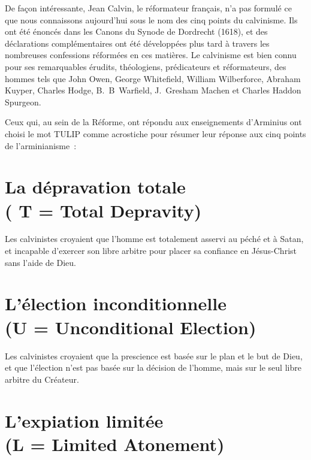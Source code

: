 
\begin{pocketpar}{}
\begin{digestpar}{}
De façon intéressante, Jean Calvin, le réformateur français, n'a pas formulé
 ce que nous con\-naissons au\-jour\-d'hui sous le nom des cinq points du calvinisme.
 Ils ont été énoncés dans les Canons du Synode de Dordrecht (1618), et des déclarations
 complémentaires ont été développées plus tard à travers les nombreuses
 confessions réformées en ces matières. Le calvinisme est bien connu
 pour 
 ses remarquables érudits, théologiens, prédicateurs et réformateurs,
 des hommes tels que John Owen, George Whitefield,
 William Wilberforce, Abraham Kuyper, Charles Hodge,\pocketlinebreak
 B.~B~Warfield, J.~Gresham Machen et
 Charles Haddon Spurgeon.
\end{digestpar}
\end{pocketpar}

Ceux qui, au sein de la Réforme, ont répondu aux enseignements d'Arminius
 ont choisi le mot \og TULIP \fg{} comme acrostiche pour résumer
 leur réponse aux cinq points de l'arminianisme~:


\newcommand*{\sectitle}[1]{%
   \normalsize(#1)}
\newcommand*{\secwithtitle}[2]{%
   \section*{#1\\\sectitle{#2}}}

\secwithtitle{La dépravation totale}{ T = Total Depravity}

Les calvinistes croyaient que l'hom\-me est totalement 
 asservi au péché  et à Satan,
 et incapable d'exercer son libre arbitre 
 pour placer sa confiance en Jésus-Christ sans l'aide de Dieu.

\secwithtitle{L'élection inconditionnelle}{U = Unconditional Election}

Les calvinistes croyaient que la prescience
 est basée sur le plan et le but de Dieu, et que l'élection
 n'est pas basée sur la décision de l'hom\-me, mais sur le seul \og libre arbitre \fg{}
 du Créateur.

\secwithtitle{L'expiation limitée}{L = Limited Atonement}

